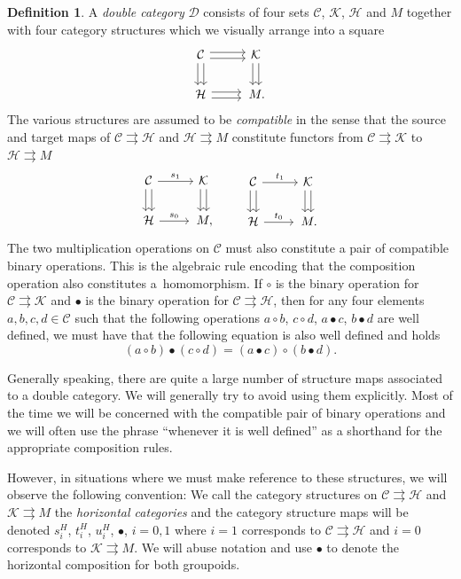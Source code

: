 \documentclass[pdftex]{sigma}
\numberwithin{equation}{section}
\theoremstyle{definition}
\newtheorem{Definition}[Theorem]{Definition}
\newcommand{\CC}{\mathcal{C}}
\newcommand{\CH}{\mathcal{H}}
\newcommand{\CK}{\mathcal{K}}
\renewcommand{\CD}{\mathcal{D}}
\newcommand{\darrow}{\arrow[d, shift right] \arrow[d, shift left]}
\newcommand{\rarrow}{\arrow[r, shift right] \arrow[r, shift left]}
\newcommand{\grpd}{\rightrightarrows}
\begin{document}
\begin{Definition}
  A \emph{double category} $ \CD $ consists of four sets $\CC$, $\CK$, $\CH$ and $M$ together with four category structures which we visually arrange into a square
 \[\begin{tikzcd}
\CC \darrow \rarrow & \CK \darrow \\
\CH \rarrow &\, M.
\end{tikzcd}\]
The various structures are assumed to be \emph{compatible} in the sense that the source and target maps of $ \CC \grpd \CH $ and $ \CH \grpd M $ constitute functors from $ \CC \grpd \CK$ to $ \CH \grpd M $
  \[
  \begin{tikzcd}
    \CC \darrow \arrow[r, "s_1"] & \CK \darrow \\
    \CH \arrow[r, "s_0"] &\, M,
  \end{tikzcd}
  \qquad
  \begin{tikzcd}
    \CC \darrow \arrow[r, "t_1"] & \CK \darrow \\
    \CH \arrow[r, "t_0"] &\, M.
  \end{tikzcd}
  \]
The two multiplication operations on $ \CC $ must also constitute a pair of compatible binary operations. This is the algebraic rule encoding that the composition operation also constitutes a~homomorphism. If $ \circ $ is the binary operation for $ \CC \grpd \CK $ and $ \bullet $ is the binary operation for $ \CC \grpd \CH $, then for any four elements $ a,b,c,d \in \CC $ such that the following operations
$a \circ b$, $c \circ d$, $a \bullet c$, $b \bullet d$ are well defined,
we must have that the following equation is also well defined and holds
\begin{equation}\label{eqn:intertwininglaw}
(a \circ b) \bullet (c \circ d) = (a \bullet c) \circ (b \bullet d).
\end{equation}
\end{Definition}
Generally speaking, there are quite a large number of structure maps associated to a double category. We will generally try to avoid using them explicitly. Most of the time we will be concerned with the compatible pair of binary operations and we will often use the phrase ``whenever it is well defined'' as a shorthand for the appropriate composition rules.

However, in situations where we must make reference to these structures, we will observe the following convention: We call the category structures on $ \CC \grpd \CH $ and $ \CK \grpd M $ the \emph{horizontal categories} and the category structure maps will be denoted
$s^H_{i}$, $t^H_{i}$, $u^H_i$, $\bullet$, $i = 0,1$
where $ i = 1$ corresponds to $ \CC \grpd \CH $ and $ i= 0 $ corresponds to $ \CK \grpd M$. We will abuse notation and use $ \bullet $ to denote the horizontal composition for both groupoids.
\end{document}
